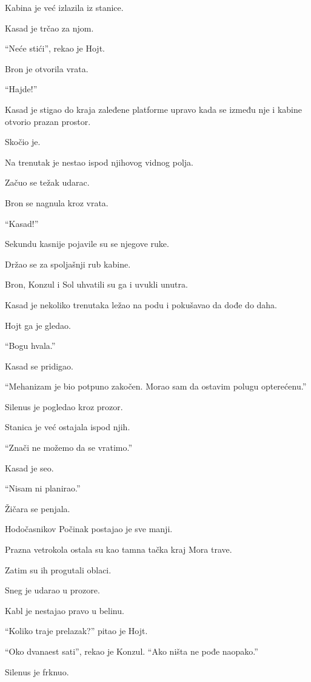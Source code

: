 \bigskip

Kabina je već izlazila iz stanice.

Kasad je trčao za njom.

``Neće stići'', rekao je Hojt.

Bron je otvorila vrata.

``Hajde!''

Kasad je stigao do kraja zaleđene platforme upravo kada se između nje i kabine otvorio prazan prostor.

Skočio je.

Na trenutak je nestao ispod njihovog vidnog polja.

Začuo se težak udarac.

Bron se nagnula kroz vrata.

``Kasad!''

Sekundu kasnije pojavile su se njegove ruke.

Držao se za spoljašnji rub kabine.

Bron, Konzul i Sol uhvatili su ga i uvukli unutra.

Kasad je nekoliko trenutaka ležao na podu i pokušavao da dođe do daha.

Hojt ga je gledao.

``Bogu hvala.''

Kasad se pridigao.

``Mehanizam je bio potpuno zakočen. Morao sam da ostavim polugu opterećenu.''

Silenus je pogledao kroz prozor.

Stanica je već ostajala ispod njih.

``Znači ne možemo da se vratimo.''

Kasad je seo.

``Nisam ni planirao.''

\bigskip

Žičara se penjala.

Hodočasnikov Počinak postajao je sve manji.

Prazna vetrokola ostala su kao tamna tačka kraj Mora trave.

Zatim su ih progutali oblaci.

Sneg je udarao u prozore.

Kabl je nestajao pravo u belinu.

``Koliko traje prelazak?'' pitao je Hojt.

``Oko dvanaest sati'', rekao je Konzul. ``Ako ništa ne pođe naopako.''

Silenus je frknuo.


